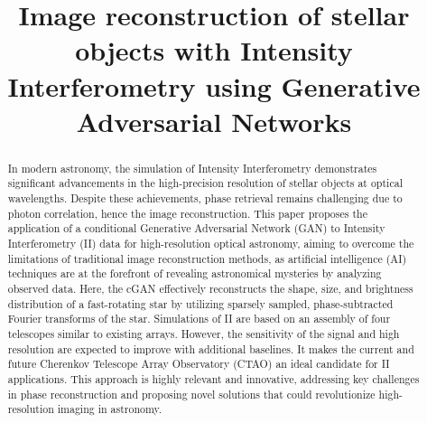 \documentclass[fleqn,usenatbib,twocolumn]{mnras}
\title{Image reconstruction of stellar objects with Intensity Interferometry using Generative Adversarial Networks}
\date{}
\begin{document}
\maketitle

\begin{abstract}
In modern astronomy, the simulation of Intensity Interferometry demonstrates significant advancements in the high-precision resolution of stellar objects at optical wavelengths. Despite these achievements, phase retrieval remains challenging due to photon correlation, hence the image reconstruction. This paper proposes the application of a conditional Generative Adversarial Network (GAN) to Intensity Interferometry (II) data for high-resolution optical astronomy, aiming to overcome the limitations of traditional image reconstruction methods, as artificial intelligence (AI) techniques are at the forefront of revealing astronomical mysteries by analyzing observed data. Here, the cGAN effectively reconstructs the shape, size, and brightness distribution of a fast-rotating star by utilizing sparsely sampled, phase-subtracted Fourier transforms of the star. Simulations of II are based on an assembly of four telescopes similar to existing arrays. However, the sensitivity of the signal and high resolution are expected to improve with additional baselines. It makes the current and future Cherenkov Telescope Array Observatory (CTAO) an ideal candidate for II applications. This approach is highly relevant and innovative, addressing key challenges in phase reconstruction and proposing novel solutions that could revolutionize high-resolution imaging in astronomy.	
\end{abstract}









\end{document}
